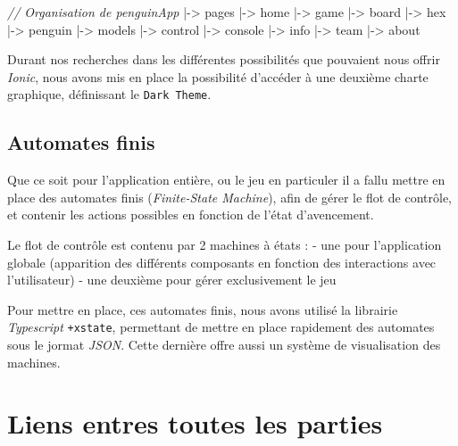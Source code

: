 \documentclass[a4paper,11pt]{article}
\newenvironment{Shaded}{}{}
\newcommand{\CommentTok}[1]{\textit{#1}}
\newcommand{\NormalTok}[1]{#1}
\begin{document}
\begin{Shaded}
\begin{Highlighting}[numbers=left,,firstnumber=0,]
\CommentTok{// Organisation de penguinApp}
\NormalTok{|-> pages}
\NormalTok{    |-> home}
\NormalTok{    |-> game}
\NormalTok{        |-> board}
\NormalTok{            |-> hex}
\NormalTok{            |-> penguin}
\NormalTok{            |-> models}
\NormalTok{        |-> control}
\NormalTok{        |-> console}
\NormalTok{        |-> info}
\NormalTok{     |-> team}
\NormalTok{     |-> about}
\end{Highlighting}
\end{Shaded}

Durant nos recherches dans les différentes possibilités que pouvaient
nous offrir \emph{Ionic}, nous avons mis en place la possibilité
d'accéder à une deuxième charte graphique, définissant le
\texttt{Dark\ Theme}.

\subsection{Automates finis}\label{automates-finis}

Que ce soit pour l'application entière, ou le jeu en particuler il a
fallu mettre en place des automates finis (\emph{Finite-State Machine}),
afin de gérer le flot de contrôle, et contenir les actions possibles en
fonction de l'état d'avencement.

Le flot de contrôle est contenu par 2 machines à états : - une pour
l'application globale (apparition des différents composants en fonction
des interactions avec l'utilisateur) - une deuxième pour gérer
exclusivement le jeu

Pour mettre en place, ces automates finis, nous avons utilisé la
librairie \emph{Typescript} \texttt{+xstate}, permettant de mettre en
place rapidement des automates sous le jormat \emph{JSON}. Cette
dernière offre aussi un système de visualisation des machines.

\section{Liens entres toutes les
parties}\label{liens-entres-toutes-les-parties}
\end{document}

